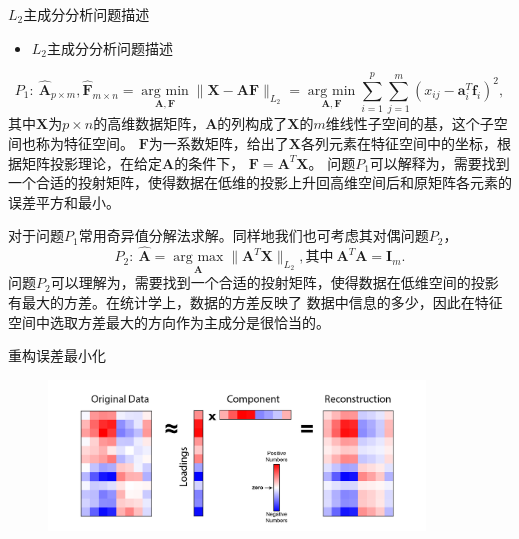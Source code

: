 \begin{frame}{$L_2$主成分分析问题描述}
    \begin{itemize}
        \item
        $L_2$主成分分析问题描述
    \end{itemize}
    \small
    \begin{equation}\label{pca-l2-p1}
        P_1: \ \hat{\bm{A}}_{p\times m}, \hat{\bm{F}}_{m\times n} = \underset{\bm{A},\bm{F}}{\operatorname{arg\ min} } 
        \|\bm{X} - \bm{A}\bm{F}\|_{L_2}
         = \underset{\bm{A}, \bm{F}}{\operatorname{arg\ min}} \sum_{i=1}^p \sum_{j=1}^m (x_{ij} - \bm a_i^T\bm f_i)^2 ,
        \end{equation}
    \tiny
        其中$\bm{X}$为$p \times n$的高维数据矩阵，$\bm{A}$的列构成了$\bm{X}$的$m$维线性子空间的基，这个子空间也称为特征空间。
        $\bm{F}$为一系数矩阵，给出了$\bm{X}$各列元素在特征空间中的坐标，根据矩阵投影理论，在给定$\bm{A}$的条件下，
        $\bm{F} = \bm{A}^T \bm{X}$。
        问题$P_1$可以解释为，需要找到一个合适的投射矩阵，使得数据在低维的投影上升回高维空间后和原矩阵各元素的误差平方和最小。
        
        对于问题$P_1$常用奇异值分解法求解。同样地我们也可考虑其对偶问题$P_2$，
    \small
        \begin{equation}\label{pca-l2-p2}
        P_2: \ \hat{\bm{A}} = \underset{\bm{A}}{\operatorname{arg\ max}} \| \bm{A}^T \bm{X}\|_{L_2}, \text{其中}\ \bm{A}^T
        \bm{A} = \bm{I}_m.
        \end{equation}
    \tiny
    问题$P_2$可以理解为，需要找到一个合适的投射矩阵，使得数据在低维空间的投影有最大的方差。在统计学上，数据的方差反映了
    数据中信息的多少，因此在特征空间中选取方差最大的方向作为主成分是很恰当的。
\end{frame}

\begin{frame}{重构误差最小化}
    \begin{figure}
        \includegraphics[width=10cm]{pics/recons-pcs.png}
    \end{figure}
\end{frame}

